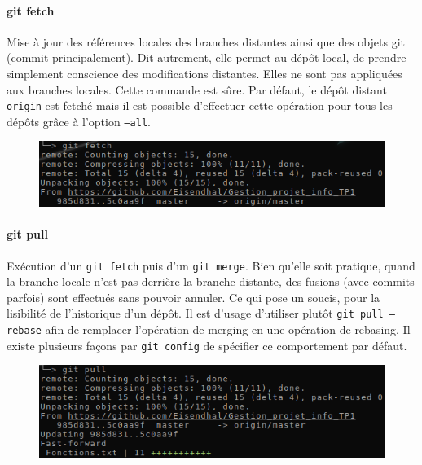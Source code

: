 \documentclass[11pt,canadien]{article}
\begin{document}
\paragraph{git fetch}Mise à jour des références locales des branches distantes ainsi que des objets git (commit principalement). Dit autrement, elle permet au dépôt local, de prendre simplement conscience des modifications distantes. Elles ne sont pas appliquées aux branches locales. Cette commande est sûre. Par défaut, le dépôt distant \texttt{origin} est fetché mais il est possible d'effectuer cette opération pour tous les dépôts grâce à l'option \texttt{--all}.
\begin{figure}[H]
	\centering
	\includegraphics{images/git_fetch.png}
\end{figure}

\paragraph{git pull}Exécution d'un \texttt{git fetch} puis d'un \texttt{git merge}. Bien qu'elle soit pratique, quand la branche locale n'est pas derrière la branche distante, des fusions (avec commits parfois) sont effectués sans pouvoir annuler. Ce qui pose un soucis, pour la lisibilité de l'historique d'un dépôt. Il est d'usage d'utiliser plutôt \texttt{git pull --rebase} afin de remplacer l'opération de merging en une opération de rebasing. Il existe plusieurs façons par \texttt{git config} de spécifier ce comportement par défaut.
\begin{figure}[H]
	\centering
	\includegraphics{images/git_pull.png}
\end{figure}
\end{document}
